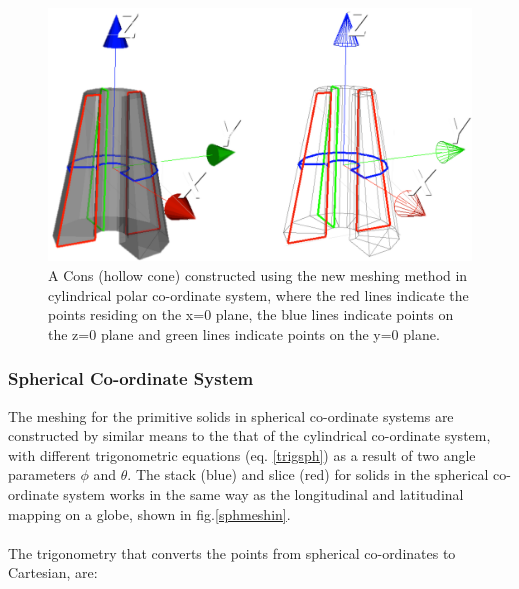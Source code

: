 \documentclass[12pt,a4paper]{article}
\begin{document}
\begin{figure}[h!]
\centering
\includegraphics[scale=0.3]{Images//Coords//consco.png}
\caption[width=\columnwidth]{A Cons (hollow cone) constructed using the new meshing method in cylindrical polar co-ordinate system, where the red lines indicate the points residing on the x=0 plane, the blue lines indicate points on the z=0 plane and green lines indicate points on the y=0 plane.}
\label{consco}
\end{figure}

\subsubsection{Spherical Co-ordinate System}
The meshing for the primitive solids in spherical co-ordinate systems are constructed by similar means to the that of the cylindrical co-ordinate system, with different trigonometric equations (eq. \ref{trigsph}) as a result of two angle parameters $\phi$ and $\theta$. The stack (blue) and slice (red) for solids in the spherical co-ordinate system works in the same way as the longitudinal and latitudinal mapping on a globe, shown in fig.\ref{sphmeshin}. 
\\\\
The trigonometry that converts the points from spherical co-ordinates to Cartesian, are:
\end{document}
